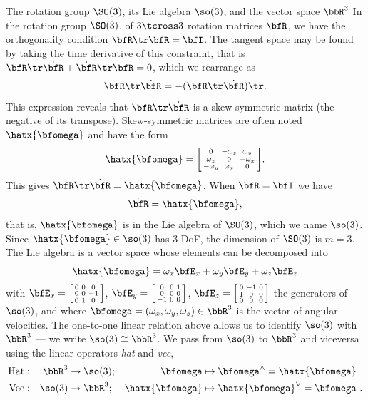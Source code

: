 
\begin{fexample}{The rotation group $\SO(3)$, its Lie algebra $\so(3)$, and the vector space $\bbR^3$}
\label{ex:SO3}
In the rotation group $\SO(3)$, of $3\tcross3$ rotation matrices $\bfR$, we have the orthogonality condition $\bfR\tr\bfR=\bfI$.
The tangent space may be found by taking the time derivative of this constraint, that is $\bfR\tr\dot\bfR+\dot\bfR\tr\bfR=0$, which we rearrange as $$\bfR\tr\dot\bfR=-(\bfR\tr\dot\bfR)\tr.$$
This expression reveals that $\bfR\tr\dot\bfR$ is a skew-symmetric matrix (the negative of its transpose). 
Skew-symmetric matrices are often noted $\hatx{\bw}$ and have the form 
%
$$\hatx{\bw}=\begin{bsmallmatrix}
0 & -\omega_z & \omega_y \\
\omega_z & 0 & -\omega_x \\
-\omega_y & \omega_x & 0 
\end{bsmallmatrix}
.$$
%
This gives $\bfR\tr\dot\bfR=\hatx{\bw}$. When $\bfR=\bfI$ we have $$\dot\bfR=\hatx{\bw},$$ that is, $\hatx{\bw}$ is in the Lie algebra of $\SO(3)$, which we name $\so(3)$.
%
Since $\hatx{\bw}\in\so(3)$ has 3 DoF, the dimension of $\SO(3)$ is $m=3$.
The Lie algebra is a vector space whose elements can be decomposed into
%
$$
\hatx{\bw} = 
  \omega_x\bfE_x+
  \omega_y\bfE_y+
  \omega_z\bfE_z
$$
with  
$
\bfE_x=
\begin{bsmallmatrix}0&0&0\\0&0&-1\\0&1&0\end{bsmallmatrix}$, 
$\bfE_y=
\begin{bsmallmatrix}0&0&1\\0&0&0\\-1&0&0\end{bsmallmatrix}$,
 $\bfE_z=
\begin{bsmallmatrix}0&-1&0\\1&0&0\\0&0&0\end{bsmallmatrix}$ 
the generators of $\so(3)$, and where $\bw=(\omega_x,\omega_y,\omega_z)\in\bbR^3$ is the vector of angular velocities. 
%
The one-to-one linear relation above allows us to identify $\so(3)$ with $\bbR^3$ --- we write $\so(3)\cong\bbR^3$.
We pass from $\so(3)$ to $\bbR^3$ and viceversa using the linear operators \emph{hat} and \emph{vee},
%
\begin{align*}
\textrm{Hat}&:& \bbR^3&\to\so(3);& \bw&\mapsto\bw^\wedge=\hatx{\bw} 
\\
\textrm{Vee}&:& \so(3)&\to\bbR^3;& \hatx{\bw}&\mapsto\hatx{\bw}^\vee=\bw
~.
\end{align*}
\end{fexample}
